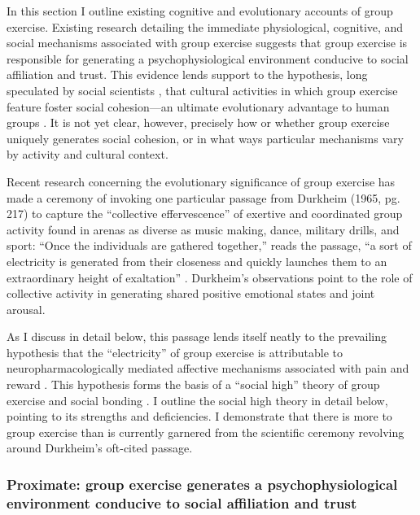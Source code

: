 \begin{CJK}{UTF8}{gbsn}
In this section I outline existing cognitive and evolutionary accounts of group exercise.  Existing research detailing the immediate physiological, cognitive, and social mechanisms associated with group exercise suggests that group exercise is responsible for generating a psychophysiological environment conducive to social affiliation and trust.  This evidence lends support to the hypothesis, long speculated by social scientists \citep[see, for example][]{Durkheim1965}, that cultural activities in which group exercise feature foster social cohesion---an ultimate evolutionary advantage to human groups \citep{Dunbar2010,Whitehouse2004}.  It is not yet clear, however, precisely how or whether group exercise uniquely generates social cohesion, or in what ways particular mechanisms vary by activity and cultural context.

Recent research concerning the evolutionary significance of group exercise has made a ceremony of invoking one particular passage from Durkheim (1965, pg. 217) to capture the ``collective effervescence'' of exertive and coordinated group activity found in arenas as diverse as music making, dance, military drills, and sport:
``Once the individuals are gathered together,'' reads the passage, ``a sort of electricity is generated from their closeness and quickly launches them to an extraordinary height of exaltation'' \citep{McNeill1995,Konvalinka2011,Fischer2014,Mogan2017}.  Durkheim's observations point to the role of collective activity in generating shared positive emotional states and joint arousal.

As I discuss in detail below, this passage lends itself neatly to the prevailing hypothesis that the ``electricity'' of group exercise is attributable to neuropharmacologically mediated affective mechanisms associated with pain and reward \citep{Dunbar2008,Cohen2009,Fischer2014,Launay2016}. This hypothesis forms the basis of a ``social high'' theory of group exercise and social bonding \citep[][; hereafter simply ``social high theory'']{Cohen2017}.  I outline the social high theory in detail below, pointing to its strengths and deficiencies.  I demonstrate that there is more to group exercise than is currently garnered from the scientific ceremony revolving around Durkheim's oft-cited passage.


\subsubsection{Proximate: group exercise generates a psychophysiological environment conducive to social affiliation and trust}


\end{CJK}
